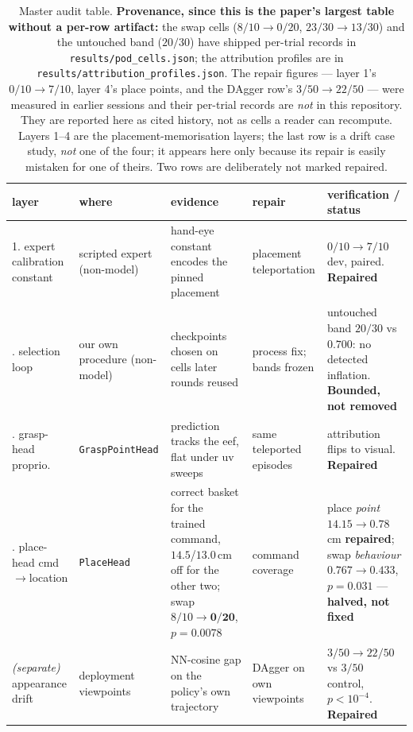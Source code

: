\documentclass[10pt,twocolumn]{article}
\begin{document}
\begin{table}[t]\centering\small
\setlength{\tabcolsep}{4pt}
\begin{tabular}{p{1.9cm}p{2.2cm}p{4.2cm}p{2.6cm}p{4.2cm}}
\toprule
layer & where & evidence & repair & verification / status \\
\midrule
1. expert calibration constant & scripted expert (non-model) &
hand-eye constant encodes the pinned placement &
placement teleportation &
$0/10 \to 7/10$ dev, paired. \textbf{Repaired} \\
\addlinespace
2. selection loop & our own procedure (non-model) &
checkpoints chosen on cells later rounds reused &
process fix; bands frozen &
untouched band $20/30$ vs $0.700$: no detected inflation.
\textbf{Bounded, not removed} \\
\addlinespace
3. grasp-head proprio. & \texttt{GraspPointHead} &
prediction tracks the eef, flat under uv sweeps &
same teleported episodes &
attribution flips to visual. \textbf{Repaired} \\
\addlinespace
4. place-head cmd$\to$location & \texttt{PlaceHead} &
correct basket for the trained command, $14.5$/$13.0$\,cm off for the other
two; swap $8/10 \to \mathbf{0/20}$, $p{=}0.0078$ &
command coverage &
place \emph{point} $14.15 \to 0.78$\,cm \textbf{repaired}; swap
\emph{behaviour} $0.767 \to 0.433$, $p{=}0.031$ --- \textbf{halved, not fixed} \\
\midrule
\emph{(separate)} appearance drift & deployment viewpoints &
NN-cosine gap on the policy's own trajectory &
DAgger on own viewpoints &
$3/50 \to 22/50$ vs $3/50$ control, $p<10^{-4}$. \textbf{Repaired} \\
\bottomrule
\end{tabular}
\caption{Master audit table. \textbf{Provenance, since this is the paper's
largest table without a per-row artifact:} the swap cells ($8/10 \to 0/20$,
$23/30 \to 13/30$) and the untouched band ($20/30$) have shipped per-trial
records in \texttt{results/pod\_cells.json}; the attribution profiles are in
\texttt{results/attribution\_profiles.json}. The repair figures --- layer 1's
$0/10 \to 7/10$, layer 4's place points, and the DAgger row's
$3/50 \to 22/50$ --- were measured in earlier sessions and their per-trial
records are \emph{not} in this repository. They are reported here as cited
history, not as cells a reader can recompute. Layers 1--4 are the placement-memorisation layers;
the last row is a drift case study, \emph{not} one of the four; it appears here
only because its repair is easily mistaken for one of theirs. Two rows are
deliberately not marked repaired.}
\label{tab:audit}
\end{table}
\end{document}
